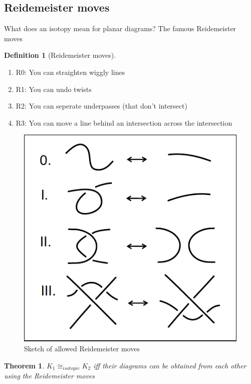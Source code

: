 \documentclass[11pt]{article}
\theoremstyle{plain}
\newtheorem{thm}{Theorem}
\theoremstyle{definition}
\newtheorem{definition}{Definition}
\begin{document}
\subsection{Reidemeister moves}

What does an isotopy mean for planar diagrams? The famous Reidemeister moves


\begin{definition}[Reidemeister moves]

  \begin{enumerate} Refer to figure~\ref{fig:reidemeister}
  \item R0: You can straighten wiggly lines
  \item R1: You can undo twists
  \item R2: You can seperate underpasses (that don't intersect)
  \item R3: You can move a line behind an intersection across the intersection
  \end{enumerate}
\end{definition}


\begin{figure}[h]
  \centering
  \includegraphics[width=\textwidth]{reidemeister.png}
  \caption{Sketch of allowed Reidemeister moves}\label{fig:reidemeister}
\end{figure}


\begin{thm}
$K_1 \cong_{isotopic} K_2$ iff their diagrams can be obtained from each other using the Reidemeister moves
\end{thm}
\end{document}
